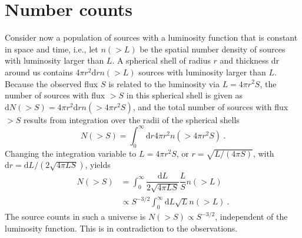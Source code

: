 \documentclass[12pt,a4paper]{article}
\newcommand{\dif}{\mathrm{d}}
\begin{document}
\section{Number counts}
\cite{2015eaci.book.....S} Consider now a population of sources with a luminosity function that is constant in space and time, i.e., let $n(> L)$ be the spatial number density of sources with luminosity larger than $L$. A spherical shell of radius $r$ and thickness dr around us contains $4 \pi r^2 \dif r n(> L)$ sources with luminosity larger than $L$. Because the observed flux $S$ is related to the luminosity via $L = 4 \pi r^2 S$, the number of sources with flux $> S$ in this spherical shell is given as $\dif N(> S) = 4\pi r^2 \dif r n(> 4\pi r^2 S)$, and the total number of sources with flux $> S$ results from integration over the radii of the spherical shells
\begin{equation}
N(>S) = \int_0^\infty \dif r 4\pi r^2 n (> 4\pi r^2 S) ~.
\end{equation}
Changing the integration variable to $L = 4\pi r^2 S$, or $r = \sqrt{L/(4\pi S)}$, with $\dif r = \dif L/(2\sqrt{4\pi LS})$, yields
\begin{align}
\nonumber N(> S) &= \int_0^\infty \dfrac{\dif L}{2\sqrt{4\pi LS}} \dfrac{L}{S} n(> L) \\
&\propto S^{-3/2} \int_0^\infty \dif L \sqrt{L} n(> L) ~.
\end{align}
The source counts in such a universe is $N(> S) \propto S^{-3/2}$, independent of the luminosity function. This is in contradiction to the observations. 










\cite{2008cosm.book.....W}



















































\end{document}
